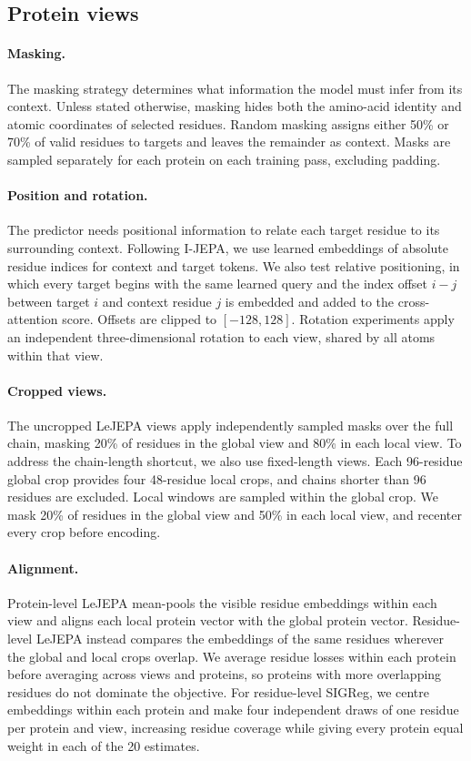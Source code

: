 \documentclass{article}
\begin{document}
\subsection{Protein views}

\paragraph{Masking.}
The masking strategy determines what information the model must infer from its context. Unless stated otherwise, masking hides both the amino-acid identity and atomic coordinates of selected residues. Random masking assigns either 50\% or 70\% of valid residues to targets and leaves the remainder as context. Masks are sampled separately for each protein on each training pass, excluding padding.

\paragraph{Position and rotation.}
The predictor needs positional information to relate each target residue to its surrounding context. Following I-JEPA, we use learned embeddings of absolute residue indices for context and target tokens. We also test relative positioning, in which every target begins with the same learned query and the index offset $i-j$ between target $i$ and context residue $j$ is embedded and added to the cross-attention score. Offsets are clipped to $[-128,128]$. Rotation experiments apply an independent three-dimensional rotation to each view, shared by all atoms within that view.

\paragraph{Cropped views.}
The uncropped LeJEPA views apply independently sampled masks over the full chain, masking 20\% of residues in the global view and 80\% in each local view. To address the chain-length shortcut, we also use fixed-length views. Each 96-residue global crop provides four 48-residue local crops, and chains shorter than 96 residues are excluded. Local windows are sampled within the global crop. We mask 20\% of residues in the global view and 50\% in each local view, and recenter every crop before encoding.

\paragraph{Alignment.}
Protein-level LeJEPA mean-pools the visible residue embeddings within each view and aligns each local protein vector with the global protein vector. Residue-level LeJEPA instead compares the embeddings of the same residues wherever the global and local crops overlap. We average residue losses within each protein before averaging across views and proteins, so proteins with more overlapping residues do not dominate the objective. For residue-level SIGReg, we centre embeddings within each protein and make four independent draws of one residue per protein and view, increasing residue coverage while giving every protein equal weight in each of the 20 estimates.
\end{document}
